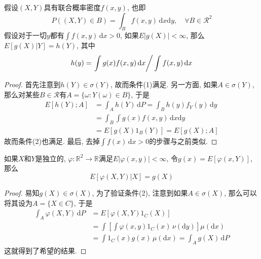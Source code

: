 \documentclass[cn, 12pt, math=mtpro2, bibstyle=apa, blue, twocol]{elegantbook}
\newcommand{\R}{\mathbb{R}}
\begin{document}
\begin{example}
假设$(X,Y)$具有联合概率密度$f(x,y)$, 也即
$$P((X,Y)\in B)=\int_B f(x,y)\,\text{d}x\text{d}y,\quad \forall B\in\mathcal{R}^2$$
假设对于一切$y$都有$\int f(x,y)\,\text{d}x>0$, 如果$E|g(X)|<\infty$, 那么$E[g(X)|Y]=h(Y)$, 其中
$$h(y)=\left.\int g(x)f(x,y)\,\text{d}x\right/\int f(x,y)\,\text{d}x$$
\end{example}
\begin{proof}
首先注意到$h(Y)\in\sigma(Y)$, 故而条件(1)满足. 另一方面, 如果$A\in\sigma(Y)$, 那么对某些$B\in\mathcal{R}$有$A=\{\omega: Y(\omega)\in B\}$, 于是
\begin{align*}
E[h(Y);A]&=\int_Ah(Y)\,\text{d}P=\int_Bh(y)f_Y(y)\,\text{d}y \\
&=\int_B\int g(x)f(x,y)\,\text{d}x\text{d}y \\
&=E[g(X)1_B(Y)]=E[g(X);A]
\end{align*}
故而条件(2)也满足. 最后, 去掉$\int f(x)\,\text{d}x>0$的步骤与之前类似.
\end{proof}

\begin{example}
如果$X$和$Y$是独立的, $\varphi:\R^2\to\R$满足$E|\varphi(x,y)|<\infty$, 令$g(x)=E[\varphi(x,Y)]$, 那么
$$E[\varphi(X,Y)|X]=g(X)$$
\end{example}
\begin{proof}
  易知$g(X)\in\sigma(X)$, 为了验证条件(2), 注意到如果$A\in\sigma(X)$, 那么可以将其设为$A=\{X\in C\}$, 于是
  \begin{align*}
  \int_A\varphi(X,Y)\,\text{d}P&=E[\varphi(X,Y)1_C(X)] \\
  &=\int\left[\int\varphi(x,y)1_C(x)\,\nu(\text{d}y)\right]\mu(\text{d}x) \\
  &=\int1_C(x)g(x)\,\mu(\text{d}x)=\int_Ag(X)\,\text{d}P
  \end{align*}
这就得到了希望的结果.
\end{proof}
\end{document}

